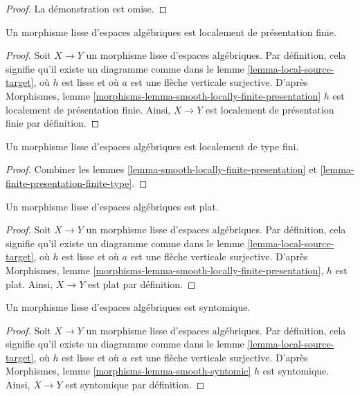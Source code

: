 \begin{proof}
La démonstration est omise.
\end{proof}

\begin{lemma}
\label{lemma-smooth-locally-finite-presentation}
Un morphisme lisse d'espaces algébriques est localement de présentation finie.
\end{lemma}

\begin{proof}
Soit $X \to Y$ un morphisme lisse d'espaces algébriques. Par
définition, cela signifie qu'il existe un diagramme comme dans le
lemme \ref{lemma-local-source-target},
où $h$ est lisse et où $a$ est une flèche verticale surjective. D'après
Morphismes, lemme \ref{morphisms-lemma-smooth-locally-finite-presentation}
$h$ est localement de présentation finie. Ainsi, $X \to Y$ est
localement de présentation finie par définition.
\end{proof}

\begin{lemma}
\label{lemma-smooth-locally-finite-type}
Un morphisme lisse d'espaces algébriques est localement de type fini.
\end{lemma}

\begin{proof}
Combiner les
lemmes \ref{lemma-smooth-locally-finite-presentation} et
\ref{lemma-finite-presentation-finite-type}.
\end{proof}

\begin{lemma}
\label{lemma-smooth-flat}
Un morphisme lisse d'espaces algébriques est plat.
\end{lemma}

\begin{proof}
Soit $X \to Y$ un morphisme lisse d'espaces algébriques. Par
définition, cela signifie qu'il existe un diagramme comme dans le
lemme \ref{lemma-local-source-target},
où $h$ est lisse et où $a$ est une flèche verticale surjective. D'après
Morphismes, lemme \ref{morphisms-lemma-smooth-locally-finite-presentation},
$h$ est plat. Ainsi, $X \to Y$ est plat par définition.
\end{proof}

\begin{lemma}
\label{lemma-smooth-syntomic}
Un morphisme lisse d'espaces algébriques est syntomique.
\end{lemma}

\begin{proof}
Soit $X \to Y$ un morphisme lisse d'espaces algébriques. Par
définition, cela signifie qu'il existe un diagramme comme dans le
lemme \ref{lemma-local-source-target},
où $h$ est lisse et où $a$ est une flèche verticale surjective. D'après
Morphismes, lemme \ref{morphisms-lemma-smooth-syntomic}
$h$ est syntomique. Ainsi, $X \to Y$ est syntomique par définition.
\end{proof}

